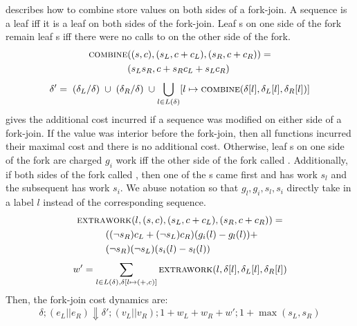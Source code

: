  describes how to combine store values on both sides of a fork-join. A sequence is a leaf iff it is a leaf on both sides of the fork-join. Leaf \get{}s on one side of the fork remain leaf \get{}s iff there were no calls to \set{} on the other side of the fork.
\begin{equation*}
  \begin{aligned}
   \text{{\sc combine}}&((s, c), (s_L, c + c_L), (s_R, c + c_R))= \\
   &(s_L s_R, c + s_R c_L + s_L c_R)
  \end{aligned}
\end{equation*}
$$\delta' = \; (\delta_L / \delta) \; \cup \; (\delta_R / \delta) \; \cup \bigcup_{l \in L(\delta)} [l \mapsto \text{{\sc combine}}(\delta[l], \delta_L[l], \delta_R[l])]$$
 gives the additional cost incurred if a sequence was modified on either side of a fork-join. If the value was interior before the fork-join, then all functions incurred their maximal cost and there is no additional cost. Otherwise, leaf \get{}s on one side of the fork are charged $g_i$ work iff the other side of the fork called \set{}. Additionally, if both sides of the fork called \set{}, then one of the \set{}s came first and has work $s_l$ and the subsequent \set{} has work $s_i$. We abuse notation so that $g_l, g_i, s_l, s_i$ directly take in a label $l$ instead of the corresponding sequence.
\begin{equation*}
  \begin{aligned}
  \text{{\sc extra}}&\text{{\sc work}}(l, (s, c), (s_L, c + c_L), (s_R, c + c_R)) = \\
  & ((\neg s_R) c_L  + (\neg s_L) c_R)(g_i(l)-g_l(l)) + \\
  & (\neg s_R) (\neg s_L) (s_i(l)-s_l(l))
 \end{aligned}
\end{equation*}
$$w' = \sum_{l \in L(\delta), \delta[l \mapsto (+, c)]} \text{{\sc extrawork}}(l, \delta[l], \delta_L[l], \delta_R[l])$$
Then, the fork-join cost dynamics are:
$$\delta; (e_L || e_R) \Downarrow \delta'; (v_L || v_R); 1 + w_L + w_R + w'; 1 + \max(s_L, s_R)$$